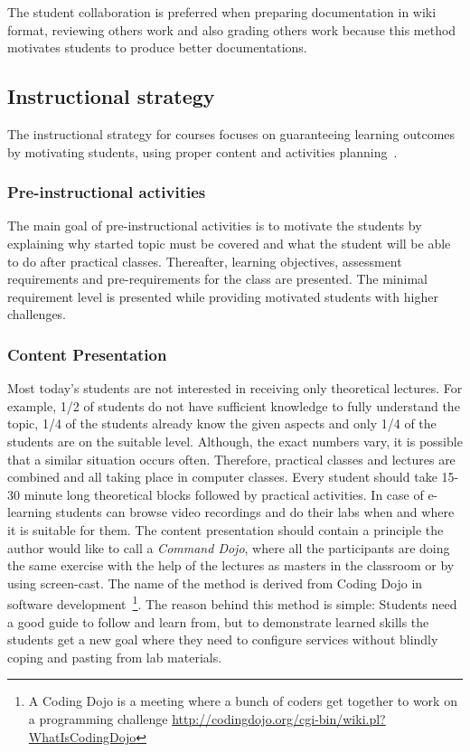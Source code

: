 The student collaboration is preferred when preparing documentation in wiki format, reviewing others work and also grading others work because this method motivates students to produce better documentations.




\subsection{Instructional strategy}
The instructional strategy for courses focuses on guaranteeing learning outcomes by motivating students, using proper content and activities planning~\citep{website:design_phase_ADDIE}.


\subsubsection{Pre-instructional activities}
The main goal of pre-instructional activities is to motivate the students by explaining why started topic must be covered and what the student will be able to do after practical classes. Thereafter, learning objectives, assessment requirements and pre-requirements for the class are presented. The minimal requirement level is presented while providing motivated students with higher challenges.


\subsubsection{Content Presentation}
Most today’s students are not interested in receiving only theoretical lectures. For example, 1/2 of students do not have sufficient knowledge to fully understand the topic, 1/4 of the students already know the given aspects and only 1/4 of the students are on the suitable level. Although, the exact numbers vary, it is possible that a similar situation occurs often. Therefore, practical classes and lectures are combined and all taking place in computer classes. Every student should take 15-30 minute long theoretical blocks followed by practical activities. In case of e-learning students can browse video recordings and do their labs when and where it is suitable for them. The content presentation should contain a principle the author would like to call a \emph{Command Dojo}, where all the  participants are doing the same exercise with the help of the lectures as masters in the classroom or by using screen-cast. The name of the method is derived from \gls{Coding Dojo} in software development~\footnote{A Coding Dojo is a meeting where a bunch of coders get together to work on a programming challenge \url{http://codingdojo.org/cgi-bin/wiki.pl?WhatIsCodingDojo}}.
The reason behind this method is simple: Students need a good guide to follow and learn from, but to demonstrate learned skills the students get a new goal where they need to configure services without blindly coping and pasting from lab materials.

